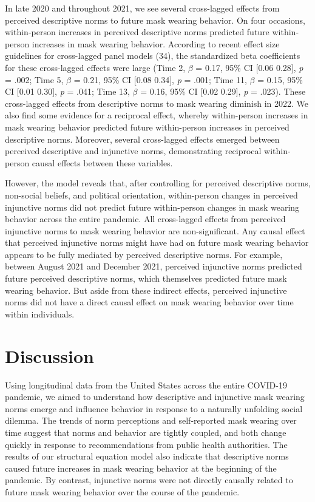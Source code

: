 \documentclass[
  man,floatsintext]{apa6}
\begin{document}
In late 2020 and throughout 2021, we see several cross-lagged effects from perceived descriptive norms to future mask wearing behavior. On four occasions, within-person increases in perceived descriptive norms predicted future within-person increases in mask wearing behavior. According to recent effect size guidelines for cross-lagged panel models (34), the standardized beta coefficients for these cross-lagged effects were large (Time 2, \(\beta\) = 0.17, 95\% CI {[}0.06 0.28{]}, \emph{p} = .002; Time 5, \(\beta\) = 0.21, 95\% CI {[}0.08 0.34{]}, \emph{p} = .001; Time 11, \(\beta\) = 0.15, 95\% CI {[}0.01 0.30{]}, \emph{p} = .041; Time 13, \(\beta\) = 0.16, 95\% CI {[}0.02 0.29{]}, \emph{p} = .023). These cross-lagged effects from descriptive norms to mask wearing diminish in 2022. We also find some evidence for a reciprocal effect, whereby within-person increases in mask wearing behavior predicted future within-person increases in perceived descriptive norms. Moreover, several cross-lagged effects emerged between perceived descriptive and injunctive norms, demonstrating reciprocal within-person causal effects between these variables.

However, the model reveals that, after controlling for perceived descriptive norms, non-social beliefs, and political orientation, within-person changes in perceived injunctive norms did not predict future within-person changes in mask wearing behavior across the entire pandemic. All cross-lagged effects from perceived injunctive norms to mask wearing behavior are non-significant. Any causal effect that perceived injunctive norms might have had on future mask wearing behavior appears to be fully mediated by perceived descriptive norms. For example, between August 2021 and December 2021, perceived injunctive norms predicted future perceived descriptive norms, which themselves predicted future mask wearing behavior. But aside from these indirect effects, perceived injunctive norms did not have a direct causal effect on mask wearing behavior over time within individuals.

\hypertarget{discussion}{%
\section{Discussion}\label{discussion}}

Using longitudinal data from the United States across the entire COVID-19 pandemic, we aimed to understand how descriptive and injunctive mask wearing norms emerge and influence behavior in response to a naturally unfolding social dilemma. The trends of norm perceptions and self-reported mask wearing over time suggest that norms and behavior are tightly coupled, and both change quickly in response to recommendations from public health authorities. The results of our structural equation model also indicate that descriptive norms caused future increases in mask wearing behavior at the beginning of the pandemic. By contrast, injunctive norms were not directly causally related to future mask wearing behavior over the course of the pandemic.
\end{document}
